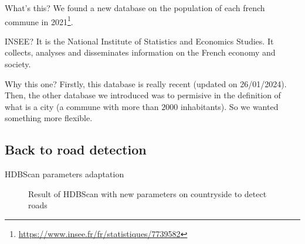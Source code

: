 \begin{frame}{What's this?}
    We found a new database on the population of each french commune in 2021\footnote{\url{https://www.insee.fr/fr/statistiques/7739582}}.
    \begin{block}{INSEE?}
        It is the National Institute of Statistics and Economics Studies. It collects, analyses and disseminates information on the French economy and society.
    \end{block}

    \begin{block}{Why this one?}
        Firstly, this database is really recent (updated on 26/01/2024). Then, the other database we introduced was to permisive in the definition of what is a city (a commune with more than $2000$ inhabitants).
        So we wanted something more flexible.
    \end{block}
\end{frame}

\subsection{Back to road detection}
\insertsubsectionframe

\begin{frame}{HDBScan parameters adaptation}
    \begin{figure}
        \caption{Result of HDBScan with new parameters on countryside to detect roads}
    \end{figure}
\end{frame}

